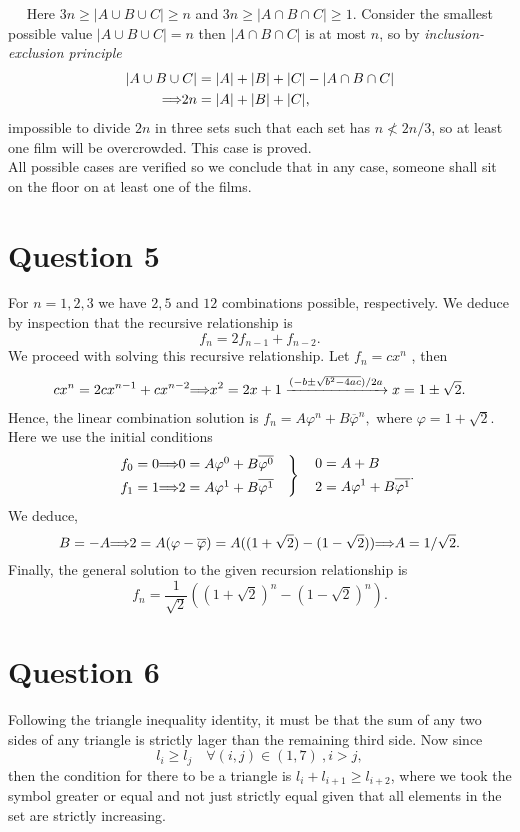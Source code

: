 \documentclass[12pt]{article}
\let\oldimplies\implies
\renewcommand*{\implies}{
	\hspace{-0.05cm}\resizebox{.95\width}{\height}{$\oldimplies$}\hspace{-0.05cm}
}
\renewcommand{\bar}{\overline}
\begin{document}
		$\quad$ Here $ 3n \ge |A \cup B \cup C| \ge n$  and $3n \ge |A \cap B \cap C| \ge 1$. Consider the smallest possible value $|A \cup B \cup C| = n$ then $|A \cap B \cap C| $ is at most $n$, so by \emph{inclusion-exclusion principle}
		\begin{align*}  
		|A \cup B \cup C| &= |A| + |B| + |C| - |A \cap B \cap C| \\
		\implies 2n &= |A| + |B| + |C|,
		\end{align*}
		impossible to divide $2n$ in three sets such that each set has $n \nless 2n/3$, so at least one film will be overcrowded. This case is proved.\\
		
		\noindent All possible cases are verified so we conclude that in any case, someone shall sit on the floor on at least one of the films.
	\section*{Question 5}
		For $n = 1, 2, 3$ we have $2,5$ and $12$ combinations possible, respectively. We deduce by inspection that the recursive relationship is 
		$$ f_{n} = 2f_{n-1} + f_{n-2}.$$
		We proceed with solving this recursive relationship. Let $f_n = cx^{n}$ , then
		\begin{align*}
			cx^{n} = 2cx^{n-1} + cx^{n-2} \implies x^{2} = 2x +1 \xrightarrow{(-b\pm \sqrt{b^{2} - 4ac} )/2a} x = 1 \pm \sqrt{2}.
		\end{align*}
		Hence, the linear combination solution is $f_{n} = A\varphi^{n} + B \bar{\varphi}^{n},$ where $\varphi = 1 + \sqrt{2}$. Here we use the initial conditions 
		$$ \begin{rcases}
			&f_0 = 0 \implies 0 = A \varphi^{0} + B\bar{\varphi^{0}} \quad\\
			&f_1 = 1 \implies 2 = A \varphi^{1} + B\bar{\varphi^{1}} \quad 
		\end{rcases} \quad 
		\begin{align}
			0 &= A + B \\
			2 &= A \varphi^{1} + B \bar{\varphi^{1}}
		\end{align}.$$
		We deduce, 
		$$ B = -A \implies 2 = A (\varphi - \bar{\varphi}) = A((1+ \sqrt{2}) - (1 - \sqrt{2})) \implies A = 1/\sqrt{2}.$$
		Finally, the general solution to the given recursion relationship is 
		$$ f_n =\frac{1}{\sqrt{2}} ((1 + \sqrt{2})^{n} - (1 - \sqrt{2})^{n}).$$
	\section*{Question 6}
		Following the triangle inequality identity, it must be that the sum of any two sides of any triangle is strictly lager than the remaining third side. Now since 
		$$ l_i \ge l_j \quad \forall (i,j) \in (1,7) \ , i > j,$$
		then the condition for there to be a triangle is $l_i + l_{i+1} \ge l_{i+2}$, where we took the symbol greater or equal and not just strictly equal given that all elements in the set are strictly increasing. \\
		
\end{document}
